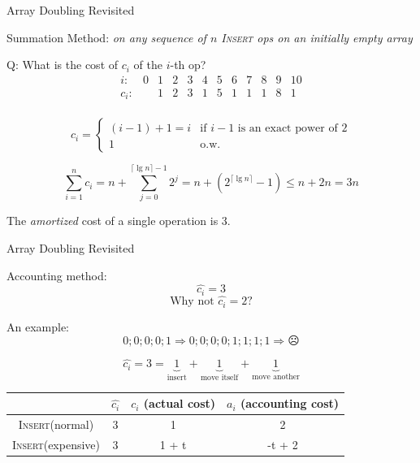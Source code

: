 \documentclass{beamer}
\begin{document}
\begin{frame}{Array Doubling Revisited}
  \begin{block}{Summation Method:}
    \emph{on any sequence of $n$ \textsc{Insert} ops on an initially empty
    array}

  \vspace{0.30cm}
  Q: What is the cost of $c_i$ of the $i$-th op?
  \[
    \begin{array}{cccccccccccc}
      i: 	& 0 & 1 & 2 & 3 & 4 & 5 & 6 & 7 & 8 & 9 & 10 \\
      c_i:  &   & 1 & 2 & 3 & 1 & 5 & 1 & 1 & 1 & 8 & 1  \\
    \end{array}
  \]

	\begin{displaymath}
	  c_i = \left\{ \begin{array}{ll}
	    (i-1)+1 = i & \textrm{if $i - 1$ is an exact power of 2}\\
	    1 & \textrm{o.w.}
	  \end{array} \right.
	\end{displaymath}

  \[
	\sum_{i=1}^{n} c_i = n + \sum_{j=0}^{\lceil \lg n \rceil - 1} 2^{j} = n +
	(2^{\lceil \lg n \rceil} - 1) \le n + 2n = 3n
  \]

  The \emph{amortized} cost of a single operation is 3.
  \end{block}
\end{frame}
\begin{frame}{Array Doubling Revisited}
  \begin{block}{Accounting method:}
	\[ \hat{c_i} = 3 \]
	\[ \textrm{Why not } \hat{c_i} = 2 ?\]

    An example:
    \[ 0;0;0;0;1 \Rightarrow 0;0;0;0;1;1;1;1 \Rightarrow \frownie{} \]

	\[
	  \hat{c_i} = 3 = \underbrace{1}_{\textrm{insert}} +
	  \underbrace{1}_{\textrm{move itself}} + \underbrace{1}_{\textrm{move another}}
	\]

  \begin{table}
    \begin{tabular}{c|ccc}
	  & $\hat{c_i}$ & $c_i$ (actual cost) & $a_i$ (accounting cost)
	  \\ \hline
	  \textsc{Insert}(normal) & 3 & 1 & 2 \\
	  \textsc{Insert}(expensive) & 3 & 1 + t & -t + 2
    \end{tabular}
  \end{table}

  \end{block}
\end{frame}
\end{document}

